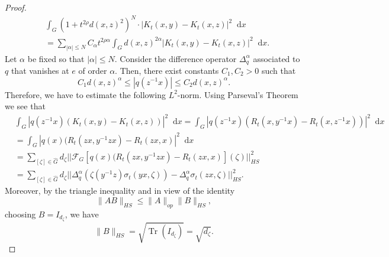 \documentclass[12pt, reqno]{amsart}
\theoremstyle{definition}
\theoremstyle{remark}
\numberwithin{equation}{section}
\newcommand*\diff{\mathop{}\!\mathrm{d}}
\begin{document}
\begin{proof}
\begin{equation*}
    \begin{aligned}
        &\int_{G}(1+t^{2\rho}d(x,z)^2)^N\cdot|K_t(x,y)-K_t(x,z)|^2\diff{x}
        \\&=\sum_{|\alpha|\leq N}C_{\alpha}t^{2\rho\alpha}\int_{G}d(x,z)^{2\alpha}|K_t(x,y)-K_t(x,z)|^2\diff{x}.
    \end{aligned}
\end{equation*}
Let $\alpha$ be fixed so that $|\alpha|\leq N$. Consider the difference operator $\Delta^{\alpha}_{q}$ associated to $q$ that vanishes at $e$ of order $\alpha$. Then, there exist constants $C_1,C_2>0$ such that
\begin{equation*}
    C_1d(x,z)^{\alpha}\leq|q(z^{-1}x)|\leq C_2 d(x,z)^{\alpha}.
\end{equation*}
Therefore, we have to estimate the following $L^2$-norm. Using Parseval's Theorem we see that
    \begin{equation*}
        \begin{aligned}
           & \int_{G}|q(z^{-1}x)(K_t(x,y)-K_t(x,z))|^2\diff{x}=\int_{G}|q(z^{-1}x)(R_t(x,y^{-1}x)-R_t(x,z^{-1}x))|^2\diff{x}\\
            &=\int_{G}|q(x)(R_t(zx,y^{-1}zx)-R_t(zx,x)|^2\diff{x}\\
            &=\sum_{[\zeta]\in\widehat{G}}d_\zeta||\mathcal{F}_G[q(x)(R_t(zx,y^{-1}zx)-R_t(zx,x)](\zeta)||^{2}_{HS}\\
            &=\sum_{[\zeta]\in\widehat{G}}d_\zeta||\Delta_{q}^{\alpha}(\zeta(y^{-1}z)\sigma_t(yx,\zeta))-\Delta_{q}^{\alpha}\sigma_t(zx,\zeta)||^{2}_{HS}.
        \end{aligned}
    \end{equation*}
  Moreover, by the triangle inequality and in view of the identity
\[
\|AB\|_{HS} \le \|A\|_{op}\|B\|_{HS},
\]
choosing \( B = I_{d_\zeta} \), we have
\begin{equation}\label{trace}
    \|B\|_{HS} = \sqrt{\operatorname{Tr}(I_{d_\zeta})}
= \sqrt{d_\zeta}.
\end{equation}


\end{proof}
\end{document}

